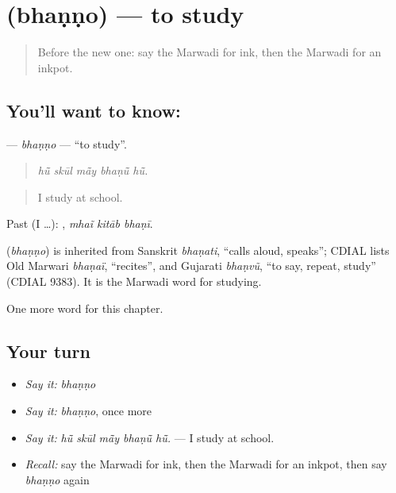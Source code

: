 \section[\texorpdfstring{\mw{भणणो} (bhaṇṇo)}{भणणो (bhaṇṇo)}]{ (bhaṇṇo) — to study}

\label{lesson:MW-C284-bhanno}



\begin{quote}
Before the new one: say the Marwadi for ink, then the Marwadi for an inkpot.
\end{quote}

\subsection*{You'll want to know: }
\textbf{} — \emph{bhaṇṇo} — \textquotedblleft{}to study\textquotedblright{}.

\begin{quote}
    
\end{quote}

\begin{quote}
\emph{hū̃ skūl mā̃y bhaṇū̃ hū̃.}
\end{quote}

\begin{quote}
I study at school.
\end{quote}

Past (I …):   , \emph{mhaĩ kitāb bhaṇī}.

\begin{cousinweb}
\textbf{} (\emph{bhaṇṇo}) is inherited from Sanskrit \emph{bhaṇati}, \textquotedblleft{}calls aloud, speaks\textquotedblright{}; CDIAL lists Old Marwari \emph{bhaṇaï}, \textquotedblleft{}recites\textquotedblright{}, and Gujarati \emph{bhaṇvũ}, \textquotedblleft{}to say, repeat, study\textquotedblright{} (CDIAL 9383). It is the Marwadi word for studying.
\end{cousinweb}

\begin{grammarlens}[title={What you've built}]
One more word for this chapter.
\end{grammarlens}

\subsection*{Your turn}
\begin{itemize}
\raggedright
  \item \emph{Say it:} \emph{bhaṇṇo}
  \item \emph{Say it:} \emph{bhaṇṇo}, once more
  \item \emph{Say it:} \emph{hū̃ skūl mā̃y bhaṇū̃ hū̃.} — I study at school.
  \item \emph{Recall:} say the Marwadi for ink, then the Marwadi for an inkpot, then say \emph{bhaṇṇo} again
\end{itemize}

